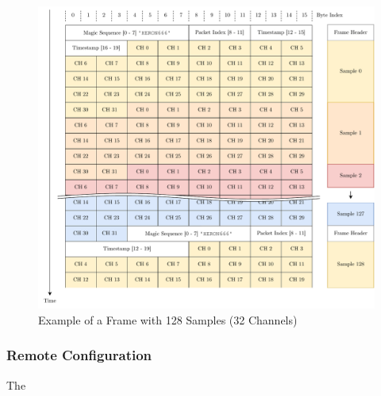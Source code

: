 \begin{figure}[h]
	\centering
	\includegraphics[width=1.0\textwidth]{images/6_design_final/Audio_Stream_Frame.pdf}
	\caption{Example of a Frame with 128 Samples (32 Channels)}
	\label{fig:frame_example}
\end{figure}

\subsubsection{Remote Configuration}
The

